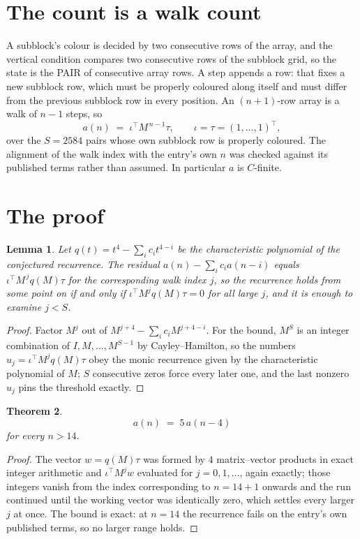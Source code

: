 \documentclass[11pt,a4paper]{article}
\theoremstyle{plain}
\newtheorem{theorem}{Theorem}
\newtheorem{lemma}[theorem]{Lemma}
\theoremstyle{definition}
\begin{document}
\section{The count is a walk count}

A subblock's colour is decided by two consecutive rows of the array, and
the vertical condition compares two consecutive rows of the subblock grid, so the state is the
PAIR of consecutive array rows. A step appends a row: that fixes a new subblock row, which
must be properly coloured along itself and must differ from the previous subblock row in every
position. An $(n+1)$-row array is a walk of $n-1$ steps, so
\[
a(n)\;=\;\iota^{\!\top}M^{\,n-1}\tau,\qquad\iota=\tau=(1,\dots,1)^{\!\top},
\]
over the $S=2584$ pairs whose own subblock row is properly coloured.
The alignment of the walk index with the entry's own $n$ was checked against its published
terms rather than assumed. In particular $a$ is $C$-finite.

\section{The proof}

\begin{lemma}\label{lem:crit}
Let $q(t)=t^{4}-\sum_i c_it^{4-i}$ be the characteristic polynomial of the
conjectured recurrence. The residual $a(n)-\sum_ic_ia(n-i)$ equals
$\iota^{\!\top}M^{\,j}q(M)\tau$ for the corresponding walk index $j$, so the recurrence
holds from some point on if and only if $\iota^{\!\top}M^{j}q(M)\tau=0$ for all large $j$,
and it is enough to examine $j<S$.
\end{lemma}

\begin{proof}
Factor $M^{j}$ out of $M^{j+4}-\sum_ic_iM^{j+4-i}$. For the bound, $M^{S}$
is an integer combination of $I,M,\dots,M^{S-1}$ by Cayley--Hamilton, so the numbers
$u_j=\iota^{\!\top}M^{j}q(M)\tau$ obey the monic recurrence given by the characteristic
polynomial of $M$; $S$ consecutive zeros force every later one, and the last nonzero $u_j$
pins the threshold exactly.
\end{proof}

\begin{theorem}
\[
a(n)\;=\;5\,a(n-4)
\]
for every $n>14$.
\end{theorem}

\begin{proof}
The vector $w=q(M)\tau$ was formed by $4$ matrix--vector products in exact integer
arithmetic and $\iota^{\!\top}M^{j}w$ evaluated for $j=0,1,\dots$, again exactly; those
integers vanish from the index corresponding to $n=14+1$ onwards and the run continued
until the working vector was identically zero, which settles every larger $j$ at once. The bound is exact: at $n=14$ the recurrence fails on the entry's own published terms, so no larger range holds.
\end{proof}
\end{document}
